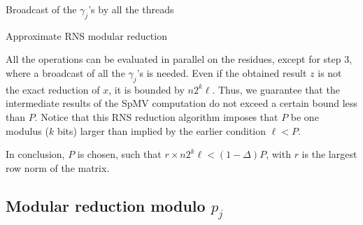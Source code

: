 \documentclass[runningheads,orivec]{llncs}
\begin{document}
\begin{algorithm}[H]
  \LinesNumbered
  \SetAlgoLined
  \DontPrintSemicolon 
  Broadcast of the $\gamma_j$'s by all the threads\\
  \caption{Approximate RNS modular reduction}
  \label{RNS modular reduction}
\end{algorithm}



All the operations can be evaluated in parallel on the residues, except for step 3, where a broadcast of all the $\gamma_j$'s is needed. Even if the obtained result $z$ is not the exact reduction of $x$, it is bounded by $n2^k{\ell}$. Thus, we guarantee that the intermediate results of the SpMV computation do not exceed a certain bound less than $P$. Notice that this RNS reduction algorithm imposes that $P$ be one modulus ($k$ bits) larger than implied by the earlier condition $\ell<P$.

In conclusion, $P$ is chosen, such that $r \times n2^{k}\ell < (1-\Delta)P$, with $r$ is the largest row norm of the matrix.


\vspace*{-0.25cm}

\subsection{Modular reduction modulo $p_j$}
\vspace*{-0.25cm}
\end{document}
